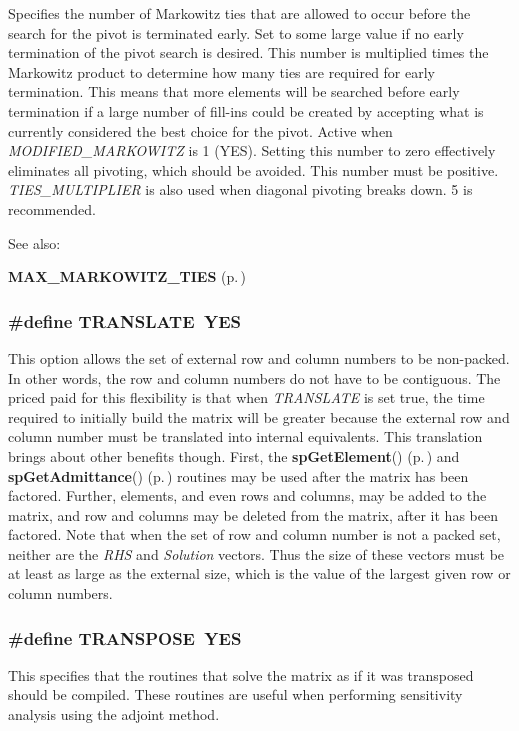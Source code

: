 Specifies the number of Markowitz ties that are allowed to occur before the search for the pivot is terminated early. Set to some large value if no early termination of the pivot search is desired. This number is multiplied times the Markowitz product to determine how many ties are required for early termination. This means that more elements will be searched before early termination if a large number of fill-ins could be created by accepting what is currently considered the best choice for the pivot. Active when {\em MODIFIED\_\-MARKOWITZ} is 1 (YES). Setting this number to zero effectively eliminates all pivoting, which should be avoided. This number must be positive. {\em TIES\_\-MULTIPLIER} is also used when diagonal pivoting breaks down. 5 is recommended. \begin{Desc}
\item[See also: ]\par
{\bf MAX\_\-MARKOWITZ\_\-TIES} {\rm (p.\,\pageref{spConfig_8h_a30})} \end{Desc}
\subsubsection{\setlength{\rightskip}{0pt plus 5cm}\#define TRANSLATE\ YES}\label{spConfig_8h_a2}


This option allows the set of external row and column numbers to be non-packed. In other words, the row and column numbers do not have to be contiguous. The priced paid for this flexibility is that when {\em TRANSLATE} is set true, the time required to initially build the matrix will be greater because the external row and column number must be translated into internal equivalents. This translation brings about other benefits though. First, the {\bf sp\-Get\-Element}() {\rm (p.\,\pageref{spBuild_8c_a12})} and {\bf sp\-Get\-Admittance}() {\rm (p.\,\pageref{spBuild_8c_a13})} routines may be used after the matrix has been factored. Further, elements, and even rows and columns, may be added to the matrix, and row and columns may be deleted from the matrix, after it has been factored. Note that when the set of row and column number is not a packed set, neither are the {\em RHS} and {\em Solution} vectors. Thus the size of these vectors must be at least as large as the external size, which is the value of the largest given row or column numbers. 
\subsubsection{\setlength{\rightskip}{0pt plus 5cm}\#define TRANSPOSE\ YES}\label{spConfig_8h_a11}


This specifies that the routines that solve the matrix as if it was transposed should be compiled. These routines are useful when performing sensitivity analysis using the adjoint method. 
